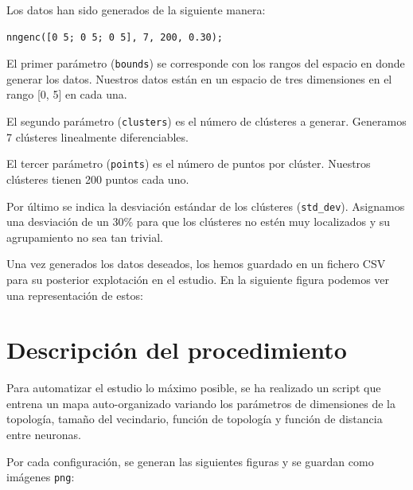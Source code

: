 \documentclass[a4paper,12pt,titlepage]{article}
\begin{document}
Los datos han sido generados de la siguiente manera:

\begin{lstlisting}
nngenc([0 5; 0 5; 0 5], 7, 200, 0.30);
\end{lstlisting}

El primer parámetro (\lstinline|bounds|) se corresponde con los rangos del espacio en donde generar los datos. Nuestros datos están en un espacio de tres dimensiones en el rango [0, 5] en cada una.

El segundo parámetro (\lstinline|clusters|) es el número de clústeres a generar. Generamos 7 clústeres linealmente diferenciables.

El tercer parámetro (\lstinline|points|) es el número de puntos por clúster. Nuestros clústeres tienen 200 puntos cada uno.

Por último se indica la desviación estándar de los clústeres (\lstinline|std_dev|). Asignamos una desviación de un 30\% para que los clústeres no estén muy localizados y su agrupamiento no sea tan trivial.

Una vez generados los datos deseados, los hemos guardado en un fichero CSV para su posterior explotación en el estudio. En la siguiente figura podemos ver una representación de estos:

\section{Descripción del procedimiento}

Para automatizar el estudio lo máximo posible, se ha realizado un script que entrena un mapa auto-organizado variando los parámetros de dimensiones de la topología, tamaño del vecindario, función de topología y función de distancia entre neuronas. 

Por cada configuración, se generan las siguientes figuras y se guardan como imágenes \lstinline|png|:
\end{document}

